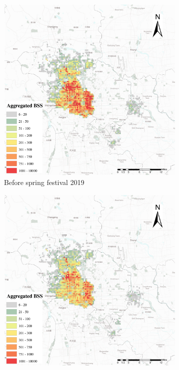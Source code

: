 \documentclass[preprints,ijgi,submit,moreauthors]{Definitions/mdpi}
\begin{document}
\begin{figure}[H]
    \vspace{6pt}
    \begin{subfigure}{.3\textwidth}
        \includegraphics[width=\textwidth]{Figures/BSSPhase1_2019.eps}
        \caption{Before spring festival 2019}
    \end{subfigure}
    \begin{subfigure}{.3\textwidth}
        \includegraphics[width=\textwidth]{Figures/BSSPhase2_2019.eps}

\end{subfigure}
\end{figure}
\end{document}

